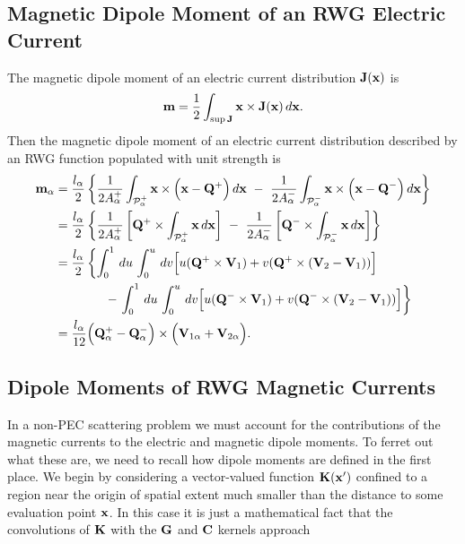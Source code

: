 \documentclass[letterpaper]{article}
\begin{document}
\subsection{Magnetic Dipole Moment of an RWG Electric Current}

The magnetic dipole moment of an electric current distribution $\mathbf{J}(\mathbf{x})$ is 
$$\mathbf{m}= \frac{1}{2} \int_{\sup \mathbf{J}}  \mathbf{x} \times \mathbf{J}(\mathbf{x}) \,d\mathbf{x}. $$
Then the magnetic dipole moment of an electric current distribution 
described by an RWG function populated with unit strength is 
\begin{align*}
  \mathbf{m}_\alpha 
&= \frac{l_\alpha}{2}
   \left\{ 
   \frac{1}{2A^+_\alpha} \int_{\mathcal{P}_\alpha^+} 
                         \mathbf{x} \times \Big(\mathbf{x}-\mathbf{Q}^+\Big) 
                         \,d\mathbf{x}  
   \,\,- \,\,
   \frac{1}{2A^-_\alpha} \int_{\mathcal{P}_\alpha^-} 
                         \mathbf{x} \times \Big(\mathbf{x}-\mathbf{Q}^-\Big) 
                         \,d\mathbf{x}  
   \right\}  \\
&= \frac{l_\alpha}{2}
   \left\{ 
   \frac{1}{2A^+_\alpha} 
     \left[\mathbf{Q}^+ \times \int_{\mathcal{P}_\alpha^+} \mathbf{x} \,d\mathbf{x}  \right]
   \,\,- \,\,
   \frac{1}{2A^-_\alpha} 
     \left[ \mathbf{Q}^- \times \int_{\mathcal{P}_\alpha^-} \mathbf{x} \,d\mathbf{x} \right]
   \right\}\\
&= \frac{l_\alpha}{2}
   \left\{ 
            \int_0^1 \,du\,\int_0^u \, dv 
            \Big[  u(\mathbf{Q}^+ \times \mathbf{V}_1) 
                  +v(\mathbf{Q}^+ \times (\mathbf{V}_2 - \mathbf{V}_1)) 
            \Big]
   \right. \\
&  \qquad \qquad- 
   \left. 
            \int_0^1 \,du\,\int_0^u \, dv 
            \Big[  u(\mathbf{Q}^- \times \mathbf{V}_1) 
                  +v(\mathbf{Q}^- \times (\mathbf{V}_2 - \mathbf{V}_1)) 
            \Big]
   \right\} \\
&= \frac{l_\alpha}{12}
   \Big(\mathbf{Q}^+_\alpha - \mathbf{Q}^-_\alpha\Big) \times 
   \Big(\mathbf{V}_{1\alpha} + \mathbf{V}_{2\alpha}\Big).
\end{align*}

\subsection{Dipole Moments of RWG Magnetic Currents}

In a non-PEC scattering problem we must account for the 
contributions of the magnetic currents to the electric
and magnetic dipole moments. To ferret out what these
are, we need to recall how dipole moments are defined
in the first place. We begin by considering a 
vector-valued function $\mathbf{K}(\mathbf{x}^\prime)$ 
confined to a region near the origin of spatial extent 
much smaller than the distance to some evaluation point 
$\mathbf{x}$. In this case it is just a mathematical fact that 
the convolutions of $\mathbf{K}$ with the $\mathbf{G}$ and $\mathbf{C}$
kernels approach 
\end{document}
